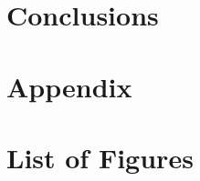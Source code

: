 \documentclass[12pt,a4paper]{article} %
\begin{document}








\section{Conclusions}
\newpage

\appendix
\section{Appendix}
\newpage

\section{List of Figures}
\listoffigures

\newpage

\printbibliography
\end{document}
